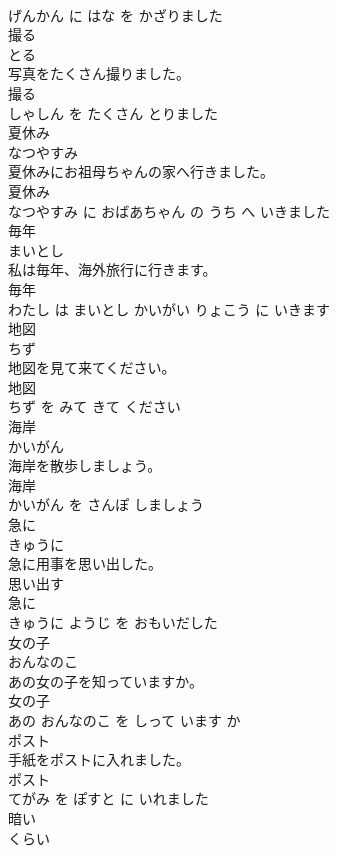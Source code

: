 \documentclass[8pt]{extreport}
\begin{document}
\begin{CJK}{UTF8}{min}
\\	げんかん に はな を かざりました			
\\	撮る	
\\	とる			
\\	写真をたくさん撮りました。	
\\	撮る 
\\	しゃしん を たくさん とりました			
\\	夏休み	
\\	なつやすみ			
\\	夏休みにお祖母ちゃんの家へ行きました。	
\\	夏休み 
\\	なつやすみ に おばあちゃん の うち へ いきました			
\\	毎年	
\\	まいとし			
\\	私は毎年、海外旅行に行きます。	
\\	毎年 
\\	わたし は まいとし かいがい りょこう に いきます			
\\	地図	
\\	ちず			
\\	地図を見て来てください。	
\\	地図 
\\	ちず を みて きて ください			
\\	海岸	
\\	かいがん			
\\	海岸を散歩しましょう。	
\\	海岸 
\\	かいがん を さんぽ しましょう			
\\	急に	
\\	きゅうに			
\\	急に用事を思い出した。	
\\	思い出す 
\\	急に 
\\	きゅうに ようじ を おもいだした			
\\	女の子	
\\	おんなのこ			
\\	あの女の子を知っていますか。	
\\	女の子 
\\	あの おんなのこ を しって います か			
\\	ポスト	
\\	手紙をポストに入れました。	
\\	ポスト 
\\	てがみ を ぽすと に いれました			
\\	暗い	
\\	くらい			

\end{CJK}
\end{document}
